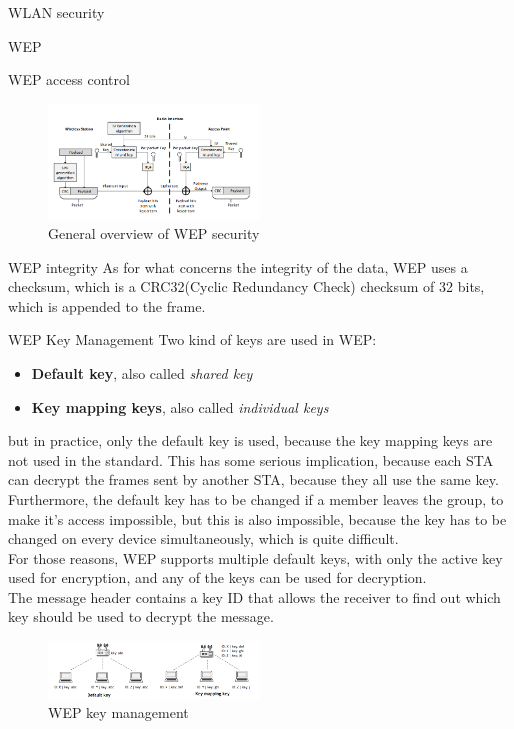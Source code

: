 \begin{section}{WLAN security}
\begin{subsection}{WEP}
\begin{subsubsection}{WEP access control}
      \begin{figure}[h]
        \centering
        \includegraphics[width=0.5\textwidth]{img/wireless/WEP security.png}
        \caption{General overview of WEP security}
      \end{figure}
    \end{subsubsection}
    \begin{subsubsection}{WEP integrity}
      As for what concerns the integrity of the data, WEP uses a checksum, which is a CRC32(Cyclic
      Redundancy Check) checksum of 32 bits, which is appended to the frame.
    \end{subsubsection}
    \begin{subsubsection}{WEP Key Management}
      Two kind of keys are used in WEP:
      \begin{itemize}
        \item \textbf{Default key}, also called \textit{shared key}
        \item \textbf{Key mapping keys}, also called \textit{individual keys}
      \end{itemize}
      but in practice, only the default key is used, because the key mapping keys are not used in the
      standard. This has some serious implication, because each STA can decrypt the frames sent by
      another STA, because they all use the same key.\\
      Furthermore, the default key has to be changed if a member leaves the group, to make it's access
      impossible, but this is also impossible, because the key has to be changed on every device 
      simultaneously, which is quite difficult.\\
      For those reasons, WEP supports multiple default keys, with only the active key used for encryption, 
      and any of the keys can be used for decryption.\\
      The message header contains a key ID that allows the receiver to find out which key should be used
      to decrypt the message.

      \begin{figure}[h]
        \centering
        \includegraphics[width=0.5\textwidth]{img/wireless/WEP key management.png}
        \caption{WEP key management}
      \end{figure}


\end{subsubsection}
\end{subsection}
\end{section}
